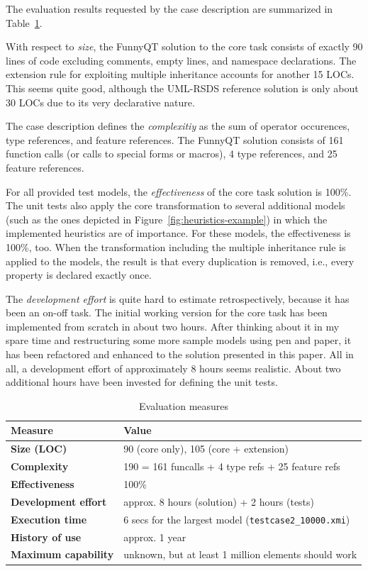 \documentclass[11pt]{article}
\begin{document}
The evaluation results requested by the case description
\cite{cdrestructcasedesc} are summarized in Table~\ref{tab:evaluation}.

With respect to \emph{size}, the FunnyQT solution to the core task consists of
exactly 90 lines of code excluding comments, empty lines, and namespace
declarations.  The extension rule for exploiting multiple inheritance accounts
for another 15 LOCs.  This seems quite good, although the UML-RSDS reference
solution is only about 30 LOCs due to its very declarative nature.

The case description defines the \emph{complexitiy} as the sum of operator
occurences, type references, and feature references.  The FunnyQT solution
consists of 161 function calls (or calls to special forms or macros), 4 type
references, and 25 feature references.

For all provided test models, the \emph{effectiveness} of the core task
solution is 100\%.  The unit tests also apply the core transformation to
several additional models (such as the ones depicted in
Figure~\ref{fig:heuristics-example}) in which the implemented heuristics are of
importance.  For these models, the effectiveness is 100\%, too.  When the
transformation including the multiple inheritance rule is applied to the
models, the result is that every duplication is removed, i.e., every property
is declared exactly once.

The \emph{development effort} is quite hard to estimate retrospectively,
because it has been an on-off task.  The initial working version for the core
task has been implemented from scratch in about two hours.  After thinking
about it in my spare time and restructuring some more sample models using pen
and paper, it has been refactored and enhanced to the solution presented in
this paper.  All in all, a development effort of approximately 8 hours seems
realistic.  About two additional hours have been invested for defining the unit
tests.

\begin{table}[htb]
  \centering
  \begin{tabular}{| l | l |}
    \hline
    \textbf{Measure}            & \textbf{Value}\\
    \hline
    \textbf{Size (LOC)}         & 90 (core only), 105 (core + extension)\\
    \textbf{Complexity}         & 190 = 161 funcalls + 4 type refs + 25 feature refs\\
    \textbf{Effectiveness}      & 100\%\\
    \textbf{Development effort} & approx. 8 hours (solution) + 2 hours (tests)\\
    \textbf{Execution time}     & 6 secs for the largest model (\verb|testcase2_10000.xmi|)\\
    \textbf{History of use}     & approx. 1 year\\
    \textbf{Maximum capability} & unknown, but at least 1 million elements should work\\
    \hline
  \end{tabular}
  \caption{Evaluation measures}
  \label{tab:evaluation}
\end{table}
\end{document}
